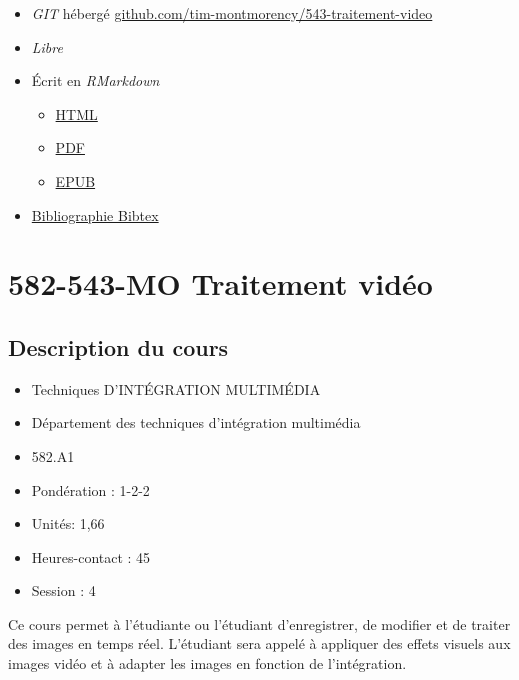 \documentclass[
  french,
]{book}
\providecommand{\tightlist}{%
  \setlength{\itemsep}{0pt}\setlength{\parskip}{0pt}}
\begin{document}
\begin{itemize}
\tightlist
\item
  \emph{GIT}\citep{torvalds_Git_2006} hébergé \href{https://github.com/tim-montmorency/543-traitement-video}{github.com/tim-montmorency/543-traitement-video}
\item
  \emph{Libre}\citep{stallman_GnuOrg_1983}
\item
  Écrit en \emph{RMarkdown}\citep{allaire_RmarkdownDynamicDocuments_2020}

  \begin{itemize}
  \tightlist
  \item
    \href{https://tim-montmorency.com/543-traitement-video/}{HTML}
  \item
    \href{https://tim-montmorency.com/543-traitement-video/traitement-video.pdf}{PDF}
  \item
    \href{https://tim-montmorency.com/543-traitement-video/traitement-video.epub}{EPUB}
  \end{itemize}
\item
  \href{https://github.com/tim-montmorency/543-traitement-video/blob/master/582543-traitement-video.bib}{Bibliographie Bibtex}
\end{itemize}

\hypertarget{mo-traitement-viduxe9o}{%
\chapter{582-543-MO Traitement vidéo}\label{mo-traitement-viduxe9o}}

\hypertarget{description-du-cours}{%
\section{Description du cours}\label{description-du-cours}}

\begin{itemize}
\tightlist
\item
  Techniques D'INTÉGRATION MULTIMÉDIA
\item
  Département des techniques d'intégration multimédia
\item
  582.A1
\item
  Pondération : 1-2-2
\item
  Unités: 1,66
\item
  Heures-contact : 45
\item
  Session : 4
\end{itemize}

Ce cours permet à l'étudiante ou l'étudiant d'enregistrer, de modifier et de traiter des images en temps réel.
L'étudiant sera appelé à appliquer des effets visuels aux images vidéo et à adapter les images en fonction de l'intégration.
\end{document}

